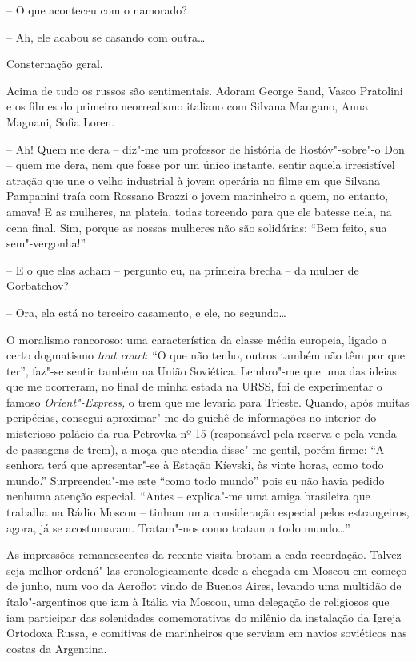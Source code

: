 -- O que aconteceu com o namorado?

-- Ah, ele acabou se casando com outra\ldots{}

Consternação geral.

Acima de tudo os russos são sentimentais. Adoram George Sand, Vasco
Pratolini e os filmes do primeiro neorrealismo italiano com Silvana
Mangano, Anna Magnani, Sofia Loren.

-- Ah! Quem me dera -- diz"-me um professor de história de Rostóv"-sobre"-o
Don -- quem me dera, nem que fosse por um único instante, sentir aquela
irresistível atração que une o velho industrial à jovem operária no
filme em que Silvana Pampanini traía com Rossano Brazzi o jovem
marinheiro a quem, no entanto, amava! E as mulheres, na plateia, todas
torcendo para que ele batesse nela, na cena final. Sim, porque as nossas
mulheres não são solidárias: ``Bem feito, sua sem"-vergonha!''

-- E o que elas acham -- pergunto eu, na primeira brecha -- da mulher de
Gorbatchov?

-- Ora, ela está no terceiro casamento, e ele, no segundo\ldots{}

O moralismo rancoroso: uma característica da classe média europeia,
ligado a certo dogmatismo \emph{tout court}: ``O que não tenho, outros
também não têm por que ter'', faz"-se sentir também na União Soviética.
Lembro"-me que uma das ideias que me ocorreram, no final de minha estada
na URSS, foi de experimentar o famoso \emph{Orient"-Express,} o trem que
me levaria para Trieste. Quando, após muitas peripécias, consegui
aproximar"-me do guichê de informações no interior do misterioso palácio
da rua Petrovka nº 15 (responsável pela reserva e pela venda de
passagens de trem), a moça que atendia disse"-me gentil, porém firme: ``A
senhora terá que apresentar"-se à Estação Kíevski, às vinte horas, como
todo mundo.'' Surpreendeu"-me este ``como todo mundo'' pois eu não havia
pedido nenhuma atenção especial. ``Antes -- explica"-me uma amiga
brasileira que trabalha na Rádio Moscou -- tinham uma consideração
especial pelos estrangeiros, agora, já se acostumaram. Tratam"-nos como
tratam a todo mundo\ldots{}''

As impressões remanescentes da recente visita brotam a cada recordação.
Talvez seja melhor ordená"-las cronologicamente desde a chegada em Moscou
em começo de junho, num voo da Aeroflot vindo de Buenos Aires, levando
uma multidão de ítalo"-argentinos que iam à Itália via Moscou, uma
delegação de religiosos que iam participar das solenidades comemorativas
do milênio da instalação da Igreja Ortodoxa Russa, e comitivas de
marinheiros que serviam em navios soviéticos nas costas da Argentina.

